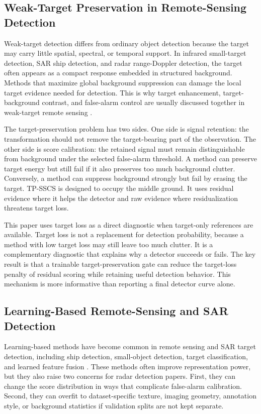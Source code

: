 \documentclass[journal]{IEEEtran}
\begin{document}
\subsection{Weak-Target Preservation in Remote-Sensing Detection}

Weak-target detection differs from ordinary object detection because the target may carry little spatial, spectral, or temporal support. In infrared small-target detection, SAR ship detection, and radar range-Doppler detection, the target often appears as a compact response embedded in structured background. Methods that maximize global background suppression can damage the local target evidence needed for detection. This is why target enhancement, target-background contrast, and false-alarm control are usually discussed together in weak-target remote sensing \cite{panagopoulos2004smalltarget,liu2020polsarcfar,chen2022drenet,liu2025pgdn,wang2019ssdd,leng2023rawsar}.

The target-preservation problem has two sides. One side is signal retention: the transformation should not remove the target-bearing part of the observation. The other side is score calibration: the retained signal must remain distinguishable from background under the selected false-alarm threshold. A method can preserve target energy but still fail if it also preserves too much background clutter. Conversely, a method can suppress background strongly but fail by erasing the target. TP-SSCS is designed to occupy the middle ground. It uses residual evidence where it helps the detector and raw evidence where residualization threatens target loss.

This paper uses target loss as a direct diagnostic when target-only references are available. Target loss is not a replacement for detection probability, because a method with low target loss may still leave too much clutter. It is a complementary diagnostic that explains why a detector succeeds or fails. The key result is that a trainable target-preservation gate can reduce the target-loss penalty of residual scoring while retaining useful detection behavior. This mechanism is more informative than reporting a final detector curve alone.

\subsection{Learning-Based Remote-Sensing and SAR Detection}

Learning-based methods have become common in remote sensing and SAR target detection, including ship detection, small-object detection, target classification, and learned feature fusion \cite{zhu2017deeprs,zhu2021deeplearningsar,eldarymli2016saratr,zou2018ram,wang2019ssdd,zhang2021ssdd,huang2018opensarship,wei2020hrsid,chen2022drenet,chen2022contrastive,leng2023rawsar}. These methods often improve representation power, but they also raise two concerns for radar detection papers. First, they can change the score distribution in ways that complicate false-alarm calibration. Second, they can overfit to dataset-specific texture, imaging geometry, annotation style, or background statistics if validation splits are not kept separate.
\end{document}
